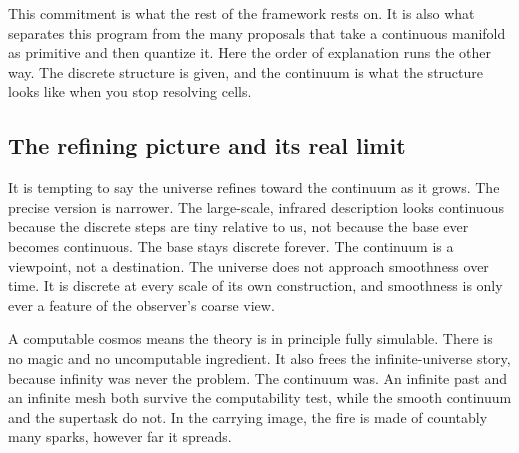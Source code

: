 This commitment is what the rest of the framework rests on. It is also what separates this program from the many
proposals that take a continuous manifold as primitive and then quantize it. Here the order of explanation runs
the other way. The discrete structure is given, and the continuum is what the structure looks like when you stop
resolving cells.

\subsection{The refining picture and its real limit}

It is tempting to say the universe refines toward the continuum as it grows. The precise version is narrower. The
large-scale, infrared description looks continuous because the discrete steps are tiny relative to us, not because
the base ever becomes continuous. The base stays discrete forever. The continuum is a viewpoint, not a
destination. The universe does not approach smoothness over time. It is discrete at every scale of its own
construction, and smoothness is only ever a feature of the observer's coarse view.


A computable cosmos means the theory is in principle fully simulable. There is no magic and no uncomputable
ingredient. It also frees the infinite-universe story, because infinity was never the problem. The continuum was.
An infinite past and an infinite mesh both survive the computability test, while the smooth continuum and the
supertask do not. In the carrying image, the fire is made of countably many sparks, however far it spreads.
